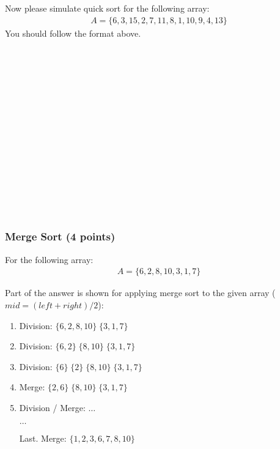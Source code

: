 \documentclass[11pt]{exam}
\begin{document}
Now please simulate quick sort for the following array:
\begin{align*}
A = \{6, 3, 15, 2, 7, 11, 8, 1, 10, 9, 4, 13\}
\end{align*}
You should follow the format above.
\begin{solution}
~\\
~\\
~\\
~\\
~\\
~\\
~\\
~\\
~\\
~\\
~\\
~\\
~\\
~\\
\end{solution}

\subsubsection{Merge Sort (4 points)}
For the following array:
\begin{align*}
A = \{6, 2, 8, 10, 3, 1, 7\}
\end{align*}

Part of the answer is shown for applying merge sort to the given array ($mid = (left + right) / 2$):
\begin{solution}
\begin{enumerate}
\item Division: $\{6,2,8,10\}\;\{3,1,7\}$
\item Division: $\{6,2\}\;\{8,10\}\;\{3,1,7\}$
\item Division: $\{6\}\;\{2\}\;\{8,10\}\;\{3,1,7\}$
\item Merge: $\{2,6\}\;\{8,10\}\;\{3,1,7\}$
\item Division / Merge: $\dots$

$\dots$

Last. Merge: $\{1,2,3,6,7,8,10\}$
\end{enumerate}
\end{solution}
\end{document}
